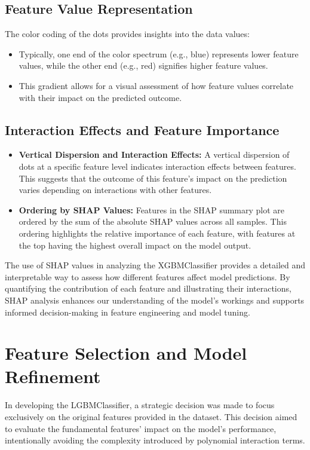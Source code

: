 \documentclass[12pt]{article}
\begin{document}
\subsection*{Feature Value Representation}
The color coding of the dots provides insights into the data values:
\begin{itemize}
    \item Typically, one end of the color spectrum (e.g., blue) represents lower feature values, while the other end (e.g., red) signifies higher feature values.
    \item This gradient allows for a visual assessment of how feature values correlate with their impact on the predicted outcome.
\end{itemize}

\subsection*{Interaction Effects and Feature Importance}
\begin{itemize}
    \item \textbf{Vertical Dispersion and Interaction Effects:} A vertical dispersion of dots at a specific feature level indicates interaction effects between features. This suggests that the outcome of this feature’s impact on the prediction varies depending on interactions with other features.
    \item \textbf{Ordering by SHAP Values:} Features in the SHAP summary plot are ordered by the sum of the absolute SHAP values across all samples. This ordering highlights the relative importance of each feature, with features at the top having the highest overall impact on the model output.
\end{itemize}

The use of SHAP values in analyzing the XGBMClassifier provides a detailed and interpretable way to assess how different features affect model predictions. By quantifying the contribution of each feature and illustrating their interactions, SHAP analysis enhances our understanding of the model's workings and supports informed decision-making in feature engineering and model tuning.

\maketitle

\section{Feature Selection and Model Refinement}
In developing the LGBMClassifier, a strategic decision was made to focus exclusively on the original features provided in the dataset. This decision aimed to evaluate the fundamental features' impact on the model's performance, intentionally avoiding the complexity introduced by polynomial interaction terms.
\end{document}
